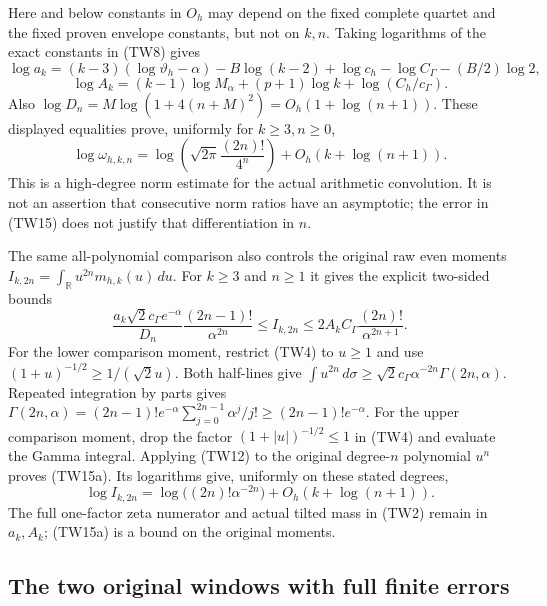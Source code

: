 Here and below constants in $O_h$ may depend on the fixed complete
quartet and the fixed proven envelope constants, but not on $k,n$.
Taking logarithms of the exact constants in (TW8) gives
\[
 \log a_k=(k-3)(\log\vartheta_h-\alpha)-B\log(k-2)
            +\log c_h-\log C_\Gamma-(B/2)\log2,
\]
\[
 \log A_k=(k-1)\log M_\alpha+(p+1)\log k
                       +\log(C_h/c_\Gamma).
\]
Also $\log D_n=M\log(1+4(n+M)^2)=O_h(1+\log(n+1))$.
These displayed equalities prove, uniformly for $k\geq3,n\geq0$,
\[
 \boxed{\log\omega_{h,k,n}=
 \log\!\left(\sqrt{2\pi}\frac{(2n)!}{4^n}\right)
 +O_h(k+\log(n+1)).}\tag{TW15}
\]
This is a high-degree norm estimate for the actual arithmetic convolution.
It is not an assertion that consecutive norm ratios have an asymptotic;
the error in (TW15) does not justify that differentiation in $n$.

The same all-polynomial comparison also controls the original raw even
moments $I_{k,2n}=\int_{\mathbb{R}}u^{2n}m_{h,k}(u)\,du$.  For
$k\geq3$ and $n\geq1$ it gives the explicit two-sided bounds
\[
 \boxed{
 \frac{a_k\sqrt2c_\Gamma e^{-\alpha}}{D_n}
       \frac{(2n-1)!}{\alpha^{2n}}
 \leq I_{k,2n}
 \leq2A_k C_\Gamma\frac{(2n)!}{\alpha^{2n+1}}.}
 \tag{TW15a}
\]
For the lower comparison moment, restrict (TW4) to $u\geq1$ and
use $(1+u)^{-1/2}\geq1/(\sqrt2u)$.  Both half-lines give
$\int u^{2n}\,d\sigma\geq\sqrt2c_\Gamma
\alpha^{-2n}\Gamma(2n,\alpha)$.
Repeated integration by parts gives
$\Gamma(2n,\alpha)=(2n-1)!e^{-\alpha}
\sum_{j=0}^{2n-1}\alpha^j/j!\geq(2n-1)!e^{-\alpha}$.
For the upper comparison moment, drop the factor
$(1+|u|)^{-1/2}\leq1$ in (TW4) and evaluate the Gamma integral.
Applying (TW12) to the original degree-$n$ polynomial $u^n$ proves
(TW15a).  Its logarithms give, uniformly on these stated degrees,
\[
 \log I_{k,2n}=\log\bigl((2n)!\alpha^{-2n}\bigr)
                    +O_h(k+\log(n+1)).\tag{TW15b}
\]
The full one-factor zeta numerator and actual tilted mass in (TW2)
remain in $a_k,A_k$; (TW15a) is a bound on the original moments.

\subsection{The two original windows with full finite errors}

